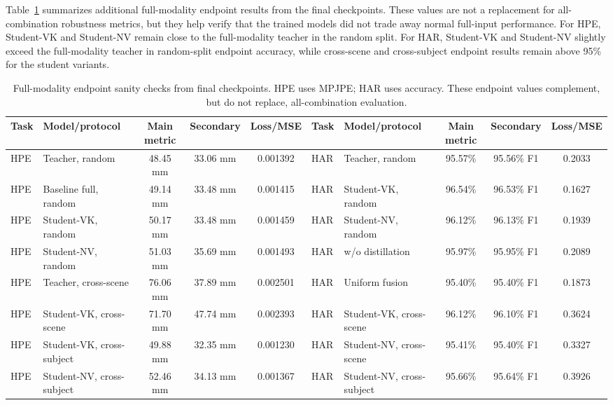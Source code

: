 \documentclass[preprint,12pt]{elsarticle}
\newcommand{\mpjpe}{MPJPE}
\begin{document}
Table~\ref{tab:endpoint_sanity} summarizes additional full-modality endpoint results from the final checkpoints. These values are not a replacement for all-combination robustness metrics, but they help verify that the trained models did not trade away normal full-input performance. For HPE, Student-VK and Student-NV remain close to the full-modality teacher in the random split. For HAR, Student-VK and Student-NV slightly exceed the full-modality teacher in random-split endpoint accuracy, while cross-scene and cross-subject endpoint results remain above 95\% for the student variants.

\begin{table}[t]
\centering
\caption{Full-modality endpoint sanity checks from final checkpoints. HPE uses \mpjpe{}; HAR uses accuracy. These endpoint values complement, but do not replace, all-combination evaluation.}
\label{tab:endpoint_sanity}
\scriptsize
\begin{adjustbox}{width=\textwidth}
\begin{tabular}{llccc|llccc}
\toprule
Task & Model/protocol & Main metric & Secondary & Loss/MSE & Task & Model/protocol & Main metric & Secondary & Loss/MSE \\
\midrule
HPE & Teacher, random & 48.45 mm & 33.06 mm & 0.001392 & HAR & Teacher, random & 95.57\% & 95.56\% F1 & 0.2033 \\
HPE & Baseline full, random & 49.14 mm & 33.48 mm & 0.001415 & HAR & Student-VK, random & 96.54\% & 96.53\% F1 & 0.1627 \\
HPE & Student-VK, random & 50.17 mm & 33.48 mm & 0.001459 & HAR & Student-NV, random & 96.12\% & 96.13\% F1 & 0.1939 \\
HPE & Student-NV, random & 51.03 mm & 35.69 mm & 0.001493 & HAR & w/o distillation & 95.97\% & 95.95\% F1 & 0.2089 \\
HPE & Teacher, cross-scene & 76.06 mm & 37.89 mm & 0.002501 & HAR & Uniform fusion & 95.40\% & 95.40\% F1 & 0.1873 \\
HPE & Student-VK, cross-scene & 71.70 mm & 47.74 mm & 0.002393 & HAR & Student-VK, cross-scene & 96.12\% & 96.10\% F1 & 0.3624 \\
HPE & Student-VK, cross-subject & 49.88 mm & 32.35 mm & 0.001230 & HAR & Student-NV, cross-scene & 95.41\% & 95.40\% F1 & 0.3327 \\
HPE & Student-NV, cross-subject & 52.46 mm & 34.13 mm & 0.001367 & HAR & Student-NV, cross-subject & 95.66\% & 95.64\% F1 & 0.3926 \\
\bottomrule
\end{tabular}
\end{adjustbox}
\end{table}
\end{document}
